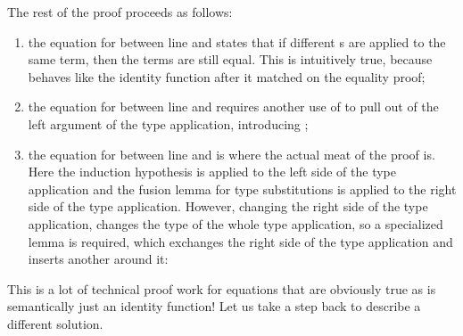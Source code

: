 \documentclass[sigplan,anonymous,review,screen]{acmart}
\newenvironment{AgdaBlock}{%
  \vspace{\AgdaEmptySkip}%
  \AgdaNoSpaceAroundCode{}%
}{%
  \AgdaSpaceAroundCode{}
  \vspace{-\AgdaEmptySkip}
}
\begin{document}


The rest of the proof proceeds as follows:
\begin{enumerate}
\item the equation for {} between line  and  states that if
  different {\Asubst}s are applied to the same term, then the terms are still equal.
  This is intuitively true, because {\Asubst} behaves like the identity function
  after it matched on the equality proof;
\item the equation for {} between line  and  requires another
  use of {} to pull out {} of the left
  argument of the type application, introducing {};
\item the equation for {} between line  and  is where
  the actual meat of the proof is. Here the induction hypothesis is applied to the
  left side of the type application and the fusion lemma for type substitutions
  is applied to the right side of the type application. However, changing
  the right side of the type application, changes the type of the
  whole type application, so a specialized {} lemma is required, which exchanges
  the right side of the type application and inserts another {\Asubst}
  {} around it:
  \begin{AgdaBlock}
    \SubstExamplesCongTApp
    \vspace{2.5mm}
    \SubstExamplesFusionESubESubBodyProofD
  \end{AgdaBlock}
\end{enumerate}

This is a lot of technical proof work for equations that are obviously
true as {\Asubst} is semantically just an identity function!
Let us take a step back to describe a different solution.
\end{document}

